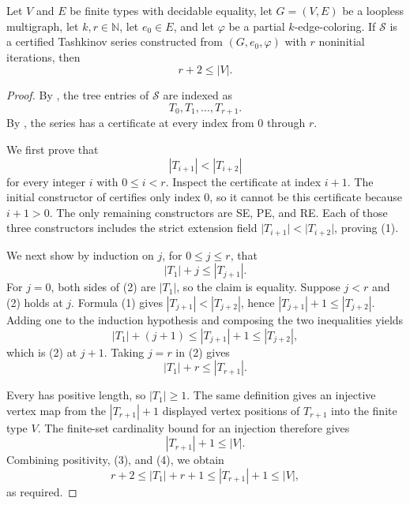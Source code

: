 \begin{lemma}
Let \(V\) and \(E\) be finite types with decidable equality, let
\(G=(V,E)\) be a loopless multigraph, let \(k,r\in\mathbb N\), let
\(e_0\in E\), and let \(\varphi\) be a partial \(k\)-edge-coloring.  If
\(\mathcal S\) is a certified Tashkinov series constructed from
\((G,e_0,\varphi)\) with \(r\) noninitial iterations, then
\[
                         r+2\leq |V|.
\]
\end{lemma}
\begin{proof}
By , the tree entries of \(\mathcal S\) are
indexed as
\[
                         T_0,T_1,\ldots,T_{r+1}.
\]
By , the series has a
 certificate at every index from \(0\) through
\(r\).

We first prove that
\[
                         |T_{i+1}|<|T_{i+2}|                 \tag{1}
\]
for every integer \(i\) with \(0\leq i<r\).  Inspect the certificate at
index \(i+1\).  The initial constructor of
 certifies only index \(0\), so it cannot be
this certificate because \(i+1>0\).  The only remaining constructors are
SE, PE, and RE.  Each of those three constructors includes the strict
extension field
\(\lvert T_{i+1}\rvert<\lvert T_{i+2}\rvert\), proving (1).

We next show by induction on \(j\), for \(0\leq j\leq r\), that
\[
                         |T_1|+j\leq |T_{j+1}|.              \tag{2}
\]
For \(j=0\), both sides of (2) are \(|T_1|\), so the claim is equality.
Suppose \(j<r\) and (2) holds at \(j\).  Formula (1) gives
\(|T_{j+1}|<|T_{j+2}|\), hence
\(|T_{j+1}|+1\leq |T_{j+2}|\).  Adding one to the induction hypothesis
and composing the two inequalities yields
\[
                 |T_1|+(j+1)\leq |T_{j+1}|+1\leq |T_{j+2}|,
\]
which is (2) at \(j+1\).  Taking \(j=r\) in (2) gives
\[
                         |T_1|+r\leq |T_{r+1}|.              \tag{3}
\]

Every  has positive length, so \(|T_1|\geq1\).
The same definition gives an injective vertex map from the
\(|T_{r+1}|+1\) displayed vertex positions of \(T_{r+1}\) into the finite
type \(V\).  The finite-set cardinality bound for an injection therefore
gives
\[
                         |T_{r+1}|+1\leq |V|.                \tag{4}
\]
Combining positivity, (3), and (4), we obtain
\[
 r+2\leq |T_1|+r+1\leq |T_{r+1}|+1\leq |V|,
\]
as required.
\end{proof}
